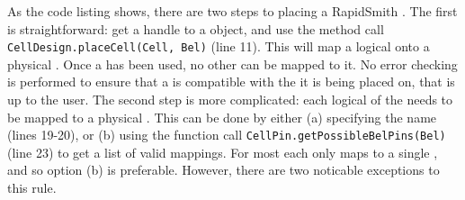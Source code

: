 \noindent
As the code listing shows, there are two steps to placing a RapidSmith
\cell. The first is straightforward: get a handle to a \bel object,
and use the method call \texttt{CellDesign.placeCell(Cell, Bel)} (line 11). This
will map a logical \cell onto a physical \bel. Once a \bel has been
used, no other \cells can be mapped to it. No error checking is performed to
ensure that a \cell is compatible with the \bel it is being placed on, that is
up to the user. The second step is more complicated: each logical \cellpin of
the \cell needs to be mapped to a physical \belpin. This can be done by
either (a) specifying the \belpin name (lines 19-20), or (b) using
the function call \texttt{CellPin.getPossibleBelPins(Bel)} (line 23) to
get a list of valid \belpin mappings. For most \cells each \cellpin only
maps to a single \belpin, and so option (b) is preferable. However, there are two
noticable exceptions to this rule.

